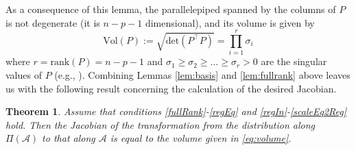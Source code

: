 \documentclass[ba]{imsart}
\newcommand{\mc}{\mathcal}
\newtheorem{theorem}{Theorem}[section]
\begin{document}
As a consequence of this lemma, 
the parallelepiped spanned by the columns of $P$ is not
degenerate (it is $n-p-1$ dimensional), and its volume
is given by
\begin{equation}
\label{eq:volume}
\text{Vol} (P) := \sqrt{\text{det}(P^\top P)}=\prod_{i=1}^{r} \sigma_i
\end{equation}
where $r=\text{rank} (P)=n-p-1$ and $\sigma_1\geq
\sigma_2\geq\dots\geq\sigma_r>0$ are the singular values of $P$ (e.g.,
\cite{miao1992}). 
Combining Lemmas \ref{lem:basis} and \ref{lem:fullrank} above leaves us with the following result concerning the calculation of the desired Jacobian.  
\begin{theorem}
\label{Jacobian}
Assume that conditions \ref{fullRank}-\ref{regEq} and \ref{regIn}-\ref{scaleEq2Reg} hold.  Then the
Jacobian of the transformation from the distribution along 
$\Pi(\mc A)$ to that along $\mc A $ is equal to the volume given in \eqref{eq:volume}.
\end{theorem}
\end{document}
